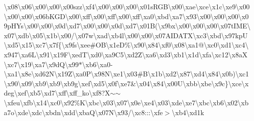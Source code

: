 \textbackslash{}x08\textbackslash{}x06\textbackslash{}x00\textbackslash{}x00\textbackslash{}x00szz\textbackslash{}xf4\textbackslash{}x00\textbackslash{}x00\textbackslash{}x00\textbackslash{}x01s\+R\+G\+B\textbackslash{}x00\textbackslash{}xae\textbackslash{}xce\textbackslash{}x1c\textbackslash{}xe9\textbackslash{}x00\textbackslash{}x00\textbackslash{}x00\textbackslash{}x06b\+K\+G\+D\textbackslash{}x00\textbackslash{}xff\textbackslash{}x00\textbackslash{}xff\textbackslash{}x00\textbackslash{}xff\textbackslash{}xa0\textbackslash{}xbd\textbackslash{}xa7\textbackslash{}x93\textbackslash{}x00\textbackslash{}x00\textbackslash{}x00\textbackslash{}x09p\+H\+Ys\textbackslash{}x00\textbackslash{}x00\textbackslash{}x0d\textbackslash{}xd7\textbackslash{}x00\textbackslash{}x00\textbackslash{}x0d\textbackslash{}xd7\textbackslash{}x01\+B(\textbackslash{}x9bx\textbackslash{}x00\textbackslash{}x00\textbackslash{}x00\textbackslash{}x07t\+I\+M\+E\textbackslash{}x07\textbackslash{}xdb\textbackslash{}x05\textbackslash{}x1b\textbackslash{}x00/\textbackslash{}x07w\textbackslash{}xad\textbackslash{}xb4l\textbackslash{}x00\textbackslash{}x00\textbackslash{}x07\+A\+I\+D\+A\+T\+X\textbackslash{}xc3\textbackslash{}xbd\textbackslash{}x97kp\+U\textbackslash{}xd5\textbackslash{}x15\textbackslash{}xc7\textbackslash{}x7f\{\textbackslash{}x9fs\textbackslash{}xee\#\+O\+B\textbackslash{}x1e\+D\%\textbackslash{}x90\textbackslash{}x84\textbackslash{}xf0\textbackslash{}x08\textbackslash{}xa1@\textbackslash{}xc0\textbackslash{}xd1\textbackslash{}xc4\textbackslash{}x947\textbackslash{}xa6\+L\textbackslash{}x91\textbackslash{}x19\+F\textbackslash{}xed\+T\textbackslash{}xd0\textbackslash{}xa9\+C5\textbackslash{}xd2\+Z\textbackslash{}xa6\textbackslash{}xd3\textbackslash{}xb1\textbackslash{}x1d\textbackslash{}xfa\textbackslash{}xc12\textbackslash{}x8a\+X\textbackslash{}xc7\textbackslash{}x19\textbackslash{}xa7\textbackslash{}x9d\+Q\textbackslash{}x99$\ast$\textbackslash{}xb6\textbackslash{}xa0-\/\textbackslash{}xa1\textbackslash{}x8e\textbackslash{}xd62\+N\textbackslash{}x19\+Z\textbackslash{}xa0\+P\textbackslash{}x98\+N\textbackslash{}xe1\textbackslash{}x03\#\+B\textbackslash{}x1b\textbackslash{}xd2\textbackslash{}x87\textbackslash{}xd4\textbackslash{}x84\textbackslash{}x0b)\textbackslash{}xc1\textbackslash{}x90\textquotesingle{}\textbackslash{}x09\textbackslash{}xb9\textbackslash{}xb9\textbackslash{}xb9g\textbackslash{}xef\textbackslash{}xd5\textbackslash{}x0f\textbackslash{}xe7\&\textbackslash{}x04\textbackslash{}x84\textbackslash{}x00\+U\textbackslash{}xbb\textbackslash{}xbe\textbackslash{}x9c\}\textbackslash{}xce\textbackslash{}xdeg\textbackslash{}xef\textbackslash{}xb5\textbackslash{}xd7\textbackslash{}xff\textbackslash{}xff\+\_\+ko\textbackslash{}xf8?\+X$\sim$$\sim$\textbackslash{}xfeu\textbackslash{}xfb\textbackslash{}x14\textbackslash{}xc0\textbackslash{}x92\%\+K\textbackslash{}xbc\textbackslash{}x03\textbackslash{}x07\textbackslash{}x0e\textbackslash{}xe4\textbackslash{}x03\textbackslash{}xde\textbackslash{}xe7\textbackslash{}xbc\textbackslash{}xb6\textbackslash{}x02\textbackslash{}xba7o\textbackslash{}xde\textbackslash{}xdc\textbackslash{}xbdn\textbackslash{}xdd\textbackslash{}xba\+Q\textbackslash{}x07\+N\textbackslash{}x93/\textbackslash{}xc8\+:::\textbackslash{}xfe$>$\textbackslash{}xb4\textbackslash{}xd1k\te